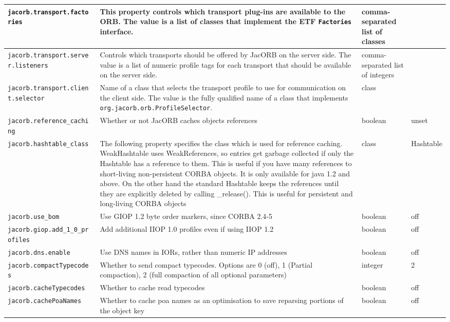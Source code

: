 {{\begin{small}
\begin{longtable}{|p{5cm}|p{7.5cm}|p{1.5cm}|p{1.5cm}|}
\verb"jacorb.transport.facto"
\verb"ries" & This property controls which transport plug-ins are
available to the ORB.  The value is a list of classes that implement the ETF
{\tt Factories} interface.
& comma-separated list of classes & \\
\hline
\verb"jacorb.transport.serve"
\verb"r.listeners" & Controls which transports should be offered by
JacORB on the server side.  The value is a list of numeric profile
tags for each transport that should be available on the server side.
& comma-separated list of integers & \\
\hline
\verb"jacorb.transport.clien"
\verb"t.selector" & Name of a class that selects the transport profile
to use for communication on the client side.  The value is the fully
qualified name of a class that implements {\tt
  org.jacorb.orb.ProfileSelector}.
& class & \\
\hline
\verb"jacorb.reference_cachi"
\verb"ng" & Whether or not JacORB caches objects references & boolean & unset  \\
\hline
\verb"jacorb.hashtable_class" & The following property specifies the
class which is used for reference caching. WeakHashtable uses
WeakReferences, so entries get garbage collected if only the Hashtable
has a reference to them. This is useful if you have many references to
short-living non-persistent CORBA objects. It is only available for
java 1.2 and above. On the other hand the standard Hashtable keeps the
references until they are explicitly deleted by calling
\_release(). This is useful for persistent and long-living CORBA
objects & class & Hashtable \\
\hline
\verb"jacorb.use_bom" & Use GIOP 1.2 byte order markers, since CORBA
2.4-5 & boolean & off  \\
\hline
\verb"jacorb.giop.add_1_0_pr"
\verb"ofiles" & Add additional IIOP 1.0 profiles even if using IIOP
1.2 & boolean & off \\
\hline
\verb"jacorb.dns.enable" & Use DNS names in IORs, rather than numeric
IP addresses & boolean & off \\
\hline
\verb"jacorb.compactTypecode"
\verb"s" & Whether to send compact typecodes. Options are 0 (off), 1
(Partial compaction), 2 (full compaction of all optional parameters) & integer & 2 \\
\hline
\verb"jacorb.cacheTypecodes" & Whether to cache read
typecodes  & boolean & off \\
\hline
\verb"jacorb.cachePoaNames" & Whether to cache poa names as an optimisation
to save reparsing portions of the object key& boolean & off \\

\end{longtable}
\end{small}}}

